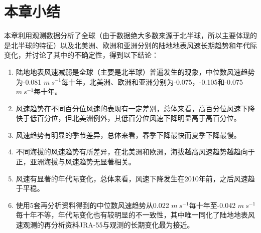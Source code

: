 \section{本章小结}

本章利用观测数据分析了全球（由于数据绝大多数来源于北半球，所以主要体现的是北半球的特征）以及北美洲、欧洲和亚洲分别的陆地地表风速长期趋势和年代际变化，并讨论了其中的不确定性，得到以下结论：

\begin{enumerate}

\item 陆地地表风速减弱是全球（主要是北半球）普遍发生的现象，中位数风速趋势为-0.081 $m ~ s^{-1}$每十年，北美洲、欧洲和亚洲分别为-0.075，-0.105和-0.075 $m ~ s^{-1}$每十年。

\item 风速趋势在不同百分位风速的表现有一定差别，总体来看，高百分位风速下降快于低百分位，但北美洲例外，其低百分位风速下降明显高于高百分位。

\item 风速趋势有明显的季节差异，总体来看，春季下降最快而夏季下降最慢。

\item 不同海拔的风速趋势有所差异，在北美洲和欧洲，海拔越高风速趋势越趋向于正，亚洲海拔与风速趋势无显著相关。

\item 风速有显著的年代际变化，总体来看，风速下降发生在2010年前，之后风速趋于平稳。

\item 使用5套再分析资料得到的中位数风速趋势从0.022 $m ~ s^{-1}$每十年至-0.042 $m ~ s^{-1}$每十年不等，年代际变化也有较明显的不一致性，其中唯一同化了陆地地表风速观测的再分析资料JRA-55与观测的长期变化最为接近。
\end{enumerate}

